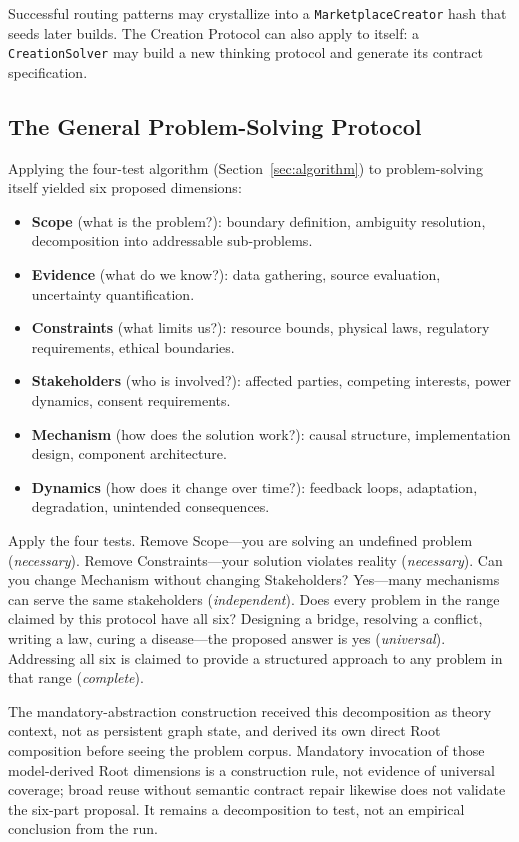 \documentclass[11pt]{article}
\let\oldtexttt\texttt
\renewcommand{\texttt}[1]{\oldtexttt{\small #1}}
\begin{document}
Successful routing patterns may crystallize into a \texttt{MarketplaceCreator} hash that seeds later builds. The Creation Protocol can also apply to itself: a \texttt{CreationSolver} may build a new thinking protocol and generate its contract specification.

\subsection{The General Problem-Solving Protocol}
\label{sec:general-protocol}

Applying the four-test algorithm (Section~\ref{sec:algorithm}) to problem-solving itself yielded six proposed dimensions:

\begin{itemize}[leftmargin=1.5em]
\item \textbf{Scope} (what is the problem?): boundary definition, ambiguity resolution, decomposition into addressable sub-problems.
\item \textbf{Evidence} (what do we know?): data gathering, source evaluation, uncertainty quantification.
\item \textbf{Constraints} (what limits us?): resource bounds, physical laws, regulatory requirements, ethical boundaries.
\item \textbf{Stakeholders} (who is involved?): affected parties, competing interests, power dynamics, consent requirements.
\item \textbf{Mechanism} (how does the solution work?): causal structure, implementation design, component architecture.
\item \textbf{Dynamics} (how does it change over time?): feedback loops, adaptation, degradation, unintended consequences.
\end{itemize}

\noindent Apply the four tests. Remove Scope---you are solving an undefined problem (\emph{necessary}). Remove Constraints---your solution violates reality (\emph{necessary}). Can you change Mechanism without changing Stakeholders? Yes---many mechanisms can serve the same stakeholders (\emph{independent}). Does every problem in the range claimed by this protocol have all six? Designing a bridge, resolving a conflict, writing a law, curing a disease---the proposed answer is yes (\emph{universal}). Addressing all six is claimed to provide a structured approach to any problem in that range (\emph{complete}).

The mandatory-abstraction construction received this decomposition as theory context, not as persistent graph state, and derived its own direct Root composition before seeing the problem corpus. Mandatory invocation of those model-derived Root dimensions is a construction rule, not evidence of universal coverage; broad reuse without semantic contract repair likewise does not validate the six-part proposal. It remains a decomposition to test, not an empirical conclusion from the run.
\end{document}
